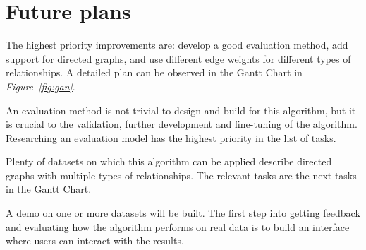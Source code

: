 \documentclass[12pt]{report}
\begin{document}
\section{Future plans}
%
The highest priority improvements are: develop a good evaluation method, add support
for directed graphs, and use different edge weights for different types of relationships.
A detailed plan can be observed in the Gantt Chart in \emph{Figure~\ref{fig:gan}}.


An evaluation method is not trivial to design and build for this algorithm, but
it is crucial to the validation, further development and fine-tuning of the algorithm.
Researching an evaluation model has the highest priority in the list of tasks.


Plenty of datasets on which this algorithm can be applied describe directed graphs
with multiple types of relationships. The relevant tasks are the next tasks in
the Gantt Chart.


A demo on one or more datasets will be built. The first step into getting feedback
and evaluating how the algorithm performs on real data is to build an interface
where users can interact with the results.
\end{document}
